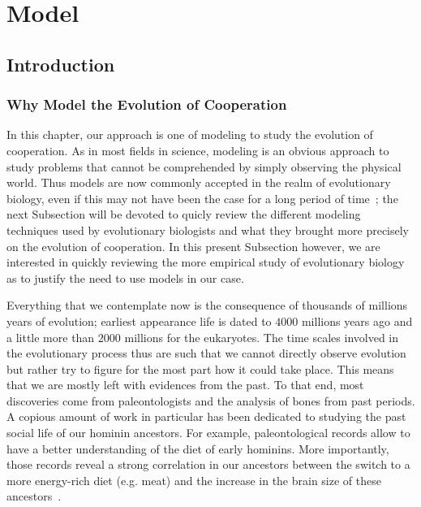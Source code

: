 \chapter{Model}
\label{chapter:model}

\minitoc[n] %

\section{Introduction}

  \subsection{Why Model the Evolution of Cooperation}

    In this chapter, our approach is one of modeling to study the evolution of cooperation. As in most fields in science, modeling is an obvious approach to study problems that cannot be comprehended by simply observing the physical world. Thus models are now commonly accepted in the realm of evolutionary biology, even if this may not have been the case for a long period of time~\cite{Shou2015}; the next Subsection will be devoted to quicly review the different modeling techniques used by evolutionary biologists and what they brought more precisely on the evolution of cooperation. In this present Subsection however, we are interested in quickly reviewing the more empirical study of evolutionary biology as to justify the need to use models in our case. 

    Everything that we contemplate now is the consequence of thousands of millions years of evolution; earliest appearance life is dated to $4000$ millions years ago and a little more than $2000$ millions for the eukaryotes. The time scales involved in the evolutionary process thus are such that we cannot directly observe evolution but rather try to figure for the most part how it could take place. This means that we are mostly left with evidences from the past. To that end, most discoveries come from paleontologists and the analysis of bones from past periods. A copious amount of work in particular has been dedicated to studying the past social life of our hominin ancestors. For example, paleontological records allow to have a better understanding of the diet of early hominins. More importantly, those records reveal a strong correlation in our ancestors between the switch to a more energy-rich diet (e.g. meat) and the increase in the brain size of these ancestors~\cite{Aiello1995, Wrangham1999}. 

